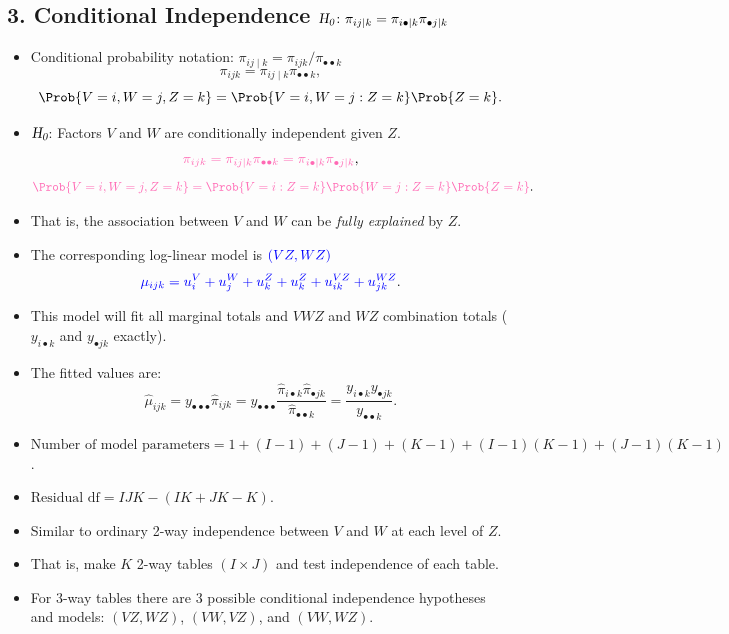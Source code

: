 \documentclass{article}\usepackage[]{graphicx}\usepackage[svgnames]{xcolor}
\providecommand\given{} %
\renewcommand\given{\nonscript\:\delimsize\vert\nonscript\:\mathopen{}}%
\renewcommand\given{\nonscript\:\delimsize\vert\nonscript\:\mathopen{}}%
\renewcommand\given{\nonscript\:\delimsize\vert\nonscript\:\mathopen{}}%
\renewcommand\given{\nonscript\:\delimsize\vert\nonscript\:\mathopen{}}%
\renewcommand\given{\nonscript\:\delimsize\vert\nonscript\:\mathopen{}}%
\renewcommand\given{\nonscript\:\delimsize\vert\nonscript\:\mathopen{}}%
\renewcommand\given{\nonscript\:\delimsize\vert\nonscript\:\mathopen{}}%
\renewcommand\given{\nonscript\:\delimsize\vert\nonscript\:\mathopen{}}%
\renewcommand\given{\nonscript\:\delimsize\vert\nonscript\:\mathopen{}}%
\renewcommand\given{\nonscript\:\delimsize\vert\nonscript\:\mathopen{}}%
\renewcommand\given{\nonscript\:\delimsize\vert\nonscript\:\mathopen{}}%
\let\log\relax%
\newcommand{\HN}{\textsl{H}_{\textsl{0}}}%
\renewcommand\given{:}
\begin{document}
\subsection*{3. Conditional Independence $ \HN\colon \pi_{ij\mid k}=\pi_{i\bullet\mid k}\pi_{\bullet j\mid k} $}
\begin{itemize}
      \item Conditional probability notation: $ \pi_{ij\mid k}=\pi_{ijk}/\pi_{\bullet\bullet k} $
            \[ \pi_{ijk}=\pi_{ij\mid k}\pi_{\bullet\bullet k}, \]
            \[ \Prob{V=i,W=j,Z=k}=\Prob{V=i,W=j\given Z=k}\Prob{Z=k}. \]
      \item $ \HN $: Factors $ V $ and $ W $ are conditionally independent given $ Z $.
            \[ \textcolor{HotPink}{
                        \pi_{ijk}=\pi_{ij\mid k}\pi_{\bullet\bullet k}=\pi_{i\bullet\mid k}\pi_{\bullet j\mid k}
                  }, \]
            \[ \textcolor{HotPink}{
                        \Prob{V=i,W=j,Z=k}=\Prob{V=i\given Z=k}\Prob{W=j\given Z=k}\Prob{Z=k}
                  }. \]
      \item That is, the association between $ V $ and $ W $ can be \emph{fully explained} by $ Z $.
      \item The corresponding log-linear model is $ \textcolor{Blue}{(VZ,WZ)} $
            \[ \textcolor{Blue}{\log{\mu}_{ijk}=u_i^V+u_j^W+u_k^Z+u_k^Z+u_{ik}^{VZ}+u_{jk}^{WZ}}. \]
      \item This model will fit all marginal totals and $ VWZ $ and $ WZ $ combination totals ($ y_{i\bullet k} $
            and $ y_{\bullet jk} $ exactly).
      \item The fitted values are:
            \[ \hat{\mu}_{ijk}=y_{\bullet\bullet\bullet}\hat{\pi}_{ijk}=y_{\bullet\bullet\bullet}\frac{\hat{\pi}_{i\bullet k}\hat{\pi}_{\bullet jk}}{\hat{\pi}_{\bullet\bullet k}}=\frac{y_{i\bullet k}y_{\bullet jk}}{y_{\bullet\bullet k}}. \]
      \item $ \text{Number of model parameters}=1 + (I - 1) + (J - 1) + (K - 1) + (I - 1)(K - 1) + (J - 1)(K - 1) $.
      \item $ \text{Residual df}=IJK - (IK + JK - K) $.
      \item Similar to ordinary 2-way independence between $V$ and $W$ at each level of $Z$.
      \item That is, make $K$ 2-way tables $ (I\times J) $ and test independence of each table.
      \item For 3-way tables there are 3 possible conditional independence hypotheses and
            models: $(VZ,WZ)$, $(VW,VZ)$, and $(VW,WZ)$.
\end{itemize}
\end{document}
